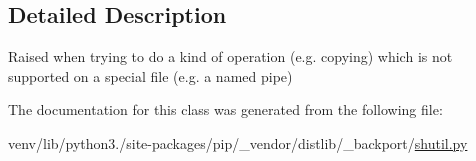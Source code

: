 \subsection{Detailed Description}
\begin{DoxyVerb}Raised when trying to do a kind of operation (e.g. copying) which is
not supported on a special file (e.g. a named pipe)\end{DoxyVerb}
 

The documentation for this class was generated from the following file\+:\begin{DoxyCompactItemize}
\item 
venv/lib/python3./site-\/packages/pip/\+\_\+vendor/distlib/\+\_\+backport/\hyperlink{shutil_8py}{shutil.\+py}\end{DoxyCompactItemize}
